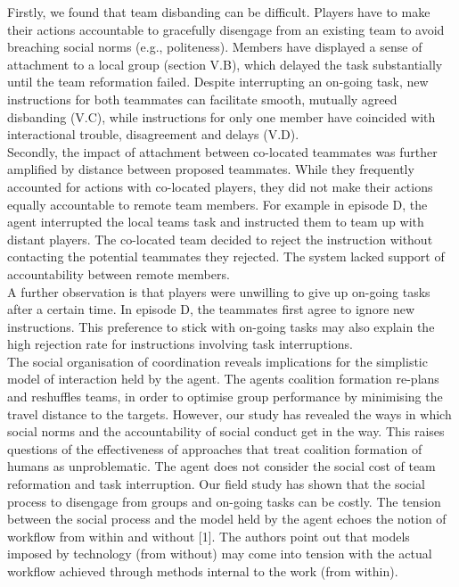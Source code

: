 Firstly, we found that team disbanding can be difficult. Players have to make their actions accountable to gracefully disengage from an existing team to avoid breaching social norms (e.g., politeness). Members have displayed a sense of attachment to a local group (section V.B), which delayed the task substantially until the team reformation failed. Despite interrupting an on-going task, new instructions for both teammates can facilitate smooth, mutually agreed disbanding (V.C), while instructions for only one member have coincided with interactional trouble, disagreement and delays (V.D). \\

Secondly, the impact of attachment between co-located teammates was further amplified by distance between proposed teammates. While they frequently accounted for actions with co-located players, they did not make their actions equally accountable to remote team members. For example in episode D, the agent interrupted the local teams task and instructed them to team up with distant players. The co-located team decided to reject the instruction without contacting the potential teammates they rejected. The system lacked support of accountability between remote members. \\

A further observation is that players were unwilling to give up on-going tasks after a certain time. In episode D, the teammates first agree to ignore new instructions. This preference to stick with on-going tasks may also explain the high rejection rate for instructions involving task interruptions. \\

The social organisation of coordination reveals implications for the simplistic model of interaction held by the agent. The agents coalition formation re-plans and reshuffles teams, in order to optimise group performance by minimising the travel distance to the targets. However, our study has revealed the ways in which social norms and the accountability of social conduct get in the way. This raises questions of the effectiveness of approaches that treat coalition formation of humans as unproblematic. The agent does not consider the social cost of team reformation and task interruption. Our field study has shown that the social process to disengage from groups and on-going tasks can be costly. The tension between the social process and the model held by the agent echoes the notion of workflow from within and without [1]. The authors point out that models imposed by technology (from without) may come into tension with the actual workflow achieved through methods internal to the work (from within). 

